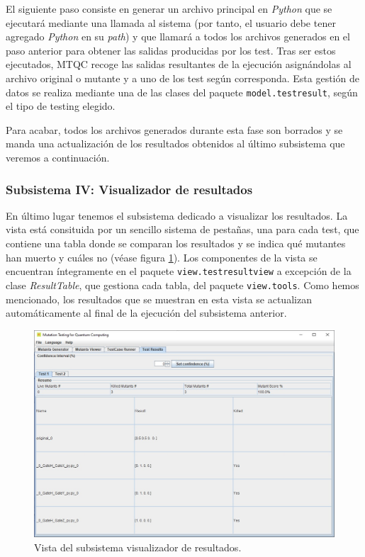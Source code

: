 El siguiente paso consiste en generar un archivo principal en \textit{Python} que se ejecutará mediante una llamada al sistema (por tanto, el usuario debe tener agregado \textit{Python} en su \textit{path}) y que llamará a todos los archivos generados en el paso anterior para obtener las salidas producidas por los test.
%
Tras ser estos ejecutados, MTQC recoge las salidas resultantes de la ejecución asignándolas al archivo original o mutante y a uno de los test según corresponda. Esta gestión de datos se realiza mediante una de las clases del paquete \texttt{model.testresult}, según el tipo de testing elegido.

Para acabar, todos los archivos generados durante esta fase son borrados y se manda una actualización de los resultados obtenidos al último subsistema que veremos a continuación.

\subsubsection{Subsistema IV: Visualizador de resultados}

En último lugar tenemos el subsistema dedicado a visualizar los resultados. La vista  está consituida por un sencillo sistema de pestañas, una para cada test, que contiene una tabla donde se comparan los resultados y se indica qué mutantes han muerto y cuáles no (véase figura \ref{fig:vista4}).
%
Los componentes de la vista se encuentran íntegramente en el paquete \texttt{view.testresultview} a excepción de la clase \textit{ResultTable}, que gestiona cada tabla, del paquete \texttt{view.tools}. Como hemos mencionado, los resultados que se muestran en esta vista se actualizan automáticamente al final de la ejecución del subsistema anterior.

\begin{figure}[tb]
\begin{center}
\includegraphics[scale=0.45]{images/vista4}
\end{center}
\caption{Vista del subsistema visualizador de resultados.}
\label{fig:vista4}
\end{figure}

